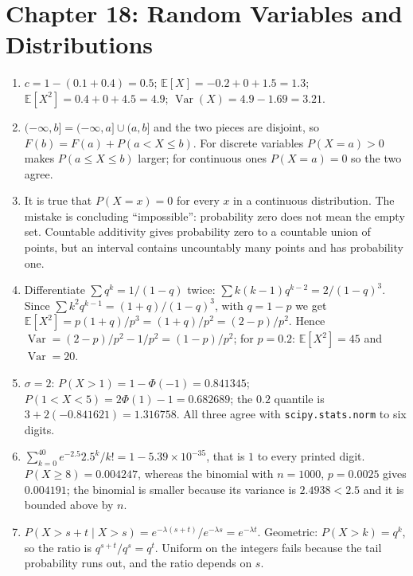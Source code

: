 \section*{Chapter 18: Random Variables and Distributions}
\begin{enumerate}[label=\textbf{18.\arabic*}]
  \item $c=1-(0.1+0.4)=0.5$; $\mathbb{E}[X]=-0.2+0+1.5=1.3$;
        $\mathbb{E}[X^{2}]=0.4+0+4.5=4.9$; $\operatorname{Var}(X)=4.9-1.69=3.21$.

  \item $(-\infty,b]=(-\infty,a]\cup(a,b]$ and the two pieces are disjoint, so
        $F(b)=F(a)+P(a<X\le b)$. For discrete variables $P(X=a)>0$ makes
        $P(a\le X\le b)$ larger; for continuous ones $P(X=a)=0$ so the two agree.

  \item It is true that $P(X=x)=0$ for every $x$ in a continuous distribution. The
        mistake is concluding ``impossible'': probability zero does not mean the empty
        set. Countable additivity gives probability zero to a countable union of points,
        but an interval contains uncountably many points and has probability one.

  \item Differentiate $\sum q^{k}=1/(1-q)$ twice: $\sum k(k-1)q^{k-2}=2/(1-q)^{3}$.
        Since $\sum k^{2}q^{k-1}=(1+q)/(1-q)^{3}$, with $q=1-p$ we get
        $\mathbb{E}[X^{2}]=p(1+q)/p^{3}=(1+q)/p^{2}=(2-p)/p^{2}$.
        Hence $\operatorname{Var}=(2-p)/p^{2}-1/p^{2}=(1-p)/p^{2}$; for $p=0.2$:
        $\mathbb{E}[X^{2}]=45$ and $\operatorname{Var}=20$.

  \item $\sigma=2$: $P(X>1)=1-\Phi(-1)=0.841345$;
        $P(1<X<5)=2\Phi(1)-1=0.682689$; the $0.2$ quantile is
        $3+2(-0.841621)=1.316758$. All three agree with
        \texttt{scipy.stats.norm} to six digits.

  \item $\sum_{k=0}^{40}e^{-2.5}2.5^{k}/k!=1-5.39\times10^{-35}$, that is $1$
        to every printed digit. $P(X\ge8)=0.004247$, whereas the binomial with
        $n=1000$, $p=0.0025$ gives $0.004191$; the binomial is smaller because
        its variance is $2.4938<2.5$ and it is bounded above by $n$.

  \item $P(X>s+t\mid X>s)=e^{-\lambda(s+t)}/e^{-\lambda s}=e^{-\lambda t}$.
        Geometric: $P(X>k)=q^{k}$, so the ratio is $q^{s+t}/q^{s}=q^{t}$. Uniform on
        the integers fails because the tail probability runs out, and the ratio depends
        on $s$.


\end{enumerate}
